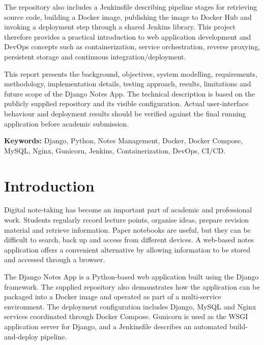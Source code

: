 \documentclass[12pt,a4paper,oneside]{report}
\begin{document}
The repository also includes a Jenkinsfile describing pipeline stages for retrieving source code, building a Docker image, publishing the image to Docker Hub and invoking a deployment step through a shared Jenkins library. This project therefore provides a practical introduction to web application development and DevOps concepts such as containerization, service orchestration, reverse proxying, persistent storage and continuous integration/deployment.

This report presents the background, objectives, system modelling, requirements, methodology, implementation details, testing approach, results, limitations and future scope of the Django Notes App. The technical description is based on the publicly supplied repository and its visible configuration. Actual user-interface behaviour and deployment results should be verified against the final running application before academic submission.

\vspace{0.1in}
\noindent\textbf{Keywords:} Django, Python, Notes Management, Docker, Docker Compose, MySQL, Nginx, Gunicorn, Jenkins, Containerization, DevOps, CI/CD.

\clearpage
\tableofcontents
\clearpage
\listoffigures
\clearpage
\listoftables

\clearpage
{}
\chapter{Introduction}

Digital note-taking has become an important part of academic and professional work. Students regularly record lecture points, organise ideas, prepare revision material and retrieve information. Paper notebooks are useful, but they can be difficult to search, back up and access from different devices. A web-based notes application offers a convenient alternative by allowing information to be stored and accessed through a browser.

The Django Notes App is a Python-based web application built using the Django framework. The supplied repository also demonstrates how the application can be packaged into a Docker image and operated as part of a multi-service environment. The deployment configuration includes Django, MySQL and Nginx services coordinated through Docker Compose. Gunicorn is used as the WSGI application server for Django, and a Jenkinsfile describes an automated build-and-deploy pipeline.
\end{document}
